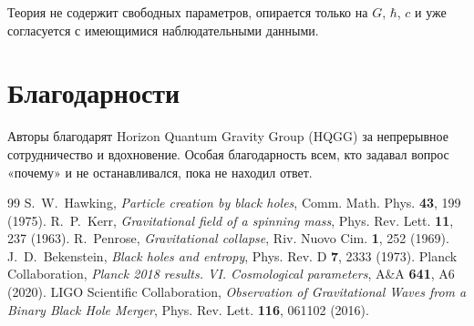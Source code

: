 \documentclass[12pt,a4paper]{article}
\begin{document}
Теория не содержит свободных параметров, опирается только на \(G\), \(\hbar\), \(c\) и уже согласуется с имеющимися наблюдательными данными.

\begin{center}
\end{center}

\section*{Благодарности}

Авторы благодарят Horizon Quantum Gravity Group (HQGG) за непрерывное сотрудничество и вдохновение. Особая благодарность всем, кто задавал вопрос «почему» и не останавливался, пока не находил ответ.

\begin{thebibliography}{99}
 S.~W.~Hawking, \textit{Particle creation by black holes}, Comm. Math. Phys. \textbf{43}, 199 (1975).
 R.~P.~Kerr, \textit{Gravitational field of a spinning mass}, Phys. Rev. Lett. \textbf{11}, 237 (1963).
 R.~Penrose, \textit{Gravitational collapse}, Riv. Nuovo Cim. \textbf{1}, 252 (1969).
 J.~D.~Bekenstein, \textit{Black holes and entropy}, Phys. Rev. D \textbf{7}, 2333 (1973).
 Planck Collaboration, \textit{Planck 2018 results. VI. Cosmological parameters}, A\&A \textbf{641}, A6 (2020).
 LIGO Scientific Collaboration, \textit{Observation of Gravitational Waves from a Binary Black Hole Merger}, Phys. Rev. Lett. \textbf{116}, 061102 (2016).
\end{thebibliography}
\end{document}
